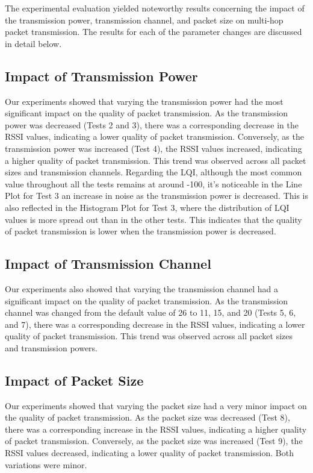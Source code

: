 \documentclass[runningheads]{llncs}
\begin{document}
\clearpage

The experimental evaluation yielded noteworthy results concerning the impact of the transmission power, transmission channel, and packet size on multi-hop packet transmission. The results for each of the parameter changes are discussed in detail below.

\subsection{Impact of Transmission Power}

Our experiments showed that varying the transmission power had the most significant impact on the quality of packet transmission. As the transmission power was decreased (Tests 2 and 3), there was a corresponding decrease in the RSSI values, indicating a lower quality of packet transmission. Conversely, as the transmission power was increased (Test 4), the RSSI values increased, indicating a higher quality of packet transmission. This trend was observed across all packet sizes and transmission channels.
Regarding the LQI, although the most common value throughout all the tests remains at around -100, it's noticeable in the Line Plot for Test 3 an increase in noise as the transmission power is decreased. This is also reflected in the Histogram Plot for Test 3, where the distribution of LQI values is more spread out than in the other tests. This indicates that the quality of packet transmission is lower when the transmission power is decreased. 

\subsection{Impact of Transmission Channel}

Our experiments also showed that varying the transmission channel had a significant impact on the quality of packet transmission. As the transmission channel was changed from the default value of 26 to 11, 15, and 20 (Tests 5, 6, and 7), there was a corresponding decrease in the RSSI values, indicating a lower quality of packet transmission. This trend was observed across all packet sizes and transmission powers.

\subsection{Impact of Packet Size}

Our experiments showed that varying the packet size had a very minor impact on the quality of packet transmission. As the packet size was decreased (Test 8), there was a corresponding increase in the RSSI values, indicating a higher quality of packet transmission. Conversely, as the packet size was increased (Test 9), the RSSI values decreased, indicating a lower quality of packet transmission. Both variations were minor.
\end{document}
